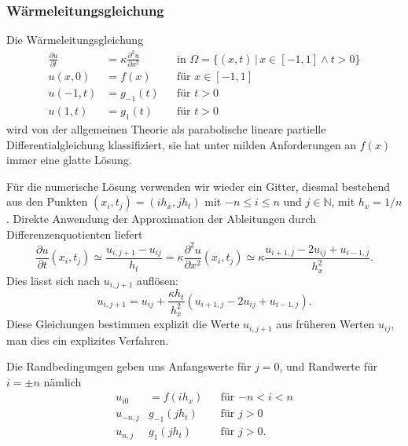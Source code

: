 \subsubsection{Wärmeleitungsgleichung}
Die Wärmeleitungsgleichung
\[
\begin{aligned}
\frac{\partial u}{\partial t}
&=
\kappa
\frac{\partial^2 u}{\partial x^2}
&&\text{in $\Omega = \{(x,t)\,|\, x\in[-1,1]\wedge t>0\}$}
\\
u(x,0)&=f(x)
&&\text{für $x\in[-1,1]$}
\\
u(-1,t)&=g_{-1}(t)
&&\text{für $t>0$}\\
u(1,t)&=g_{1}(t)
&&\text{für $t>0$}
\end{aligned}
\]
wird von der allgemeinen Theorie \cite{skript:pde} als parabolische
lineare partielle Differentialgleichung klassifiziert, sie hat
unter milden Anforderungen an $f(x)$ immer eine glatte Lösung.

Für die numerische Lösung verwenden wir wieder ein Gitter, diesmal bestehend
aus den Punkten $(x_i, t_j)=(ih_x, jh_t)$ mit $-n \le i \le n$ und
$j\in\mathbb N$, mit $h_x=1/n$.
Direkte Anwendung der Approximation der Ableitungen durch
Differenzenquotienten liefert
\begin{equation}
\frac{\partial u}{\partial t}(x_i,t_j)
\simeq
\frac{u_{i,j+1}-u_{ij}}{h_t}
=
\kappa
\frac{\partial^2u}{\partial x^2}(x_i,t_j)
\simeq
\kappa
\frac{u_{i+1,j}-2u_{ij}+u_{i-1,j}}{h_x^2}.
\end{equation}
Dies lässt sich nach $u_{i,j+1}$ auflösen:
\[
u_{i,j+1}
=
u_{ij}
+
\frac{\kappa h_t}{h_x^2} (u_{i+1,j}-2u_{ij}+u_{i-1,j}).
\]
Diese Gleichungen bestimmen explizit die Werte $u_{i,j+1}$ aus früheren Werten
$u_{ij}$, man dies ein explizites Verfahren.

Die Randbedingungen geben uns Anfangswerte für $j=0$, und Randwerte
für $i=\pm n$ nämlich
\begin{equation}
\begin{aligned}
u_{i0} &= f(ih_x)&&\text{für $-n<i<n$}\\
u_{-n,j} & g_{-1}(jh_t)&&\text{für $j>0$}\\
u_{n,j} & g_{1}(jh_t)&&\text{für $j>0$.}
\end{aligned}
\label{skript:waerme:rand}
\end{equation}

